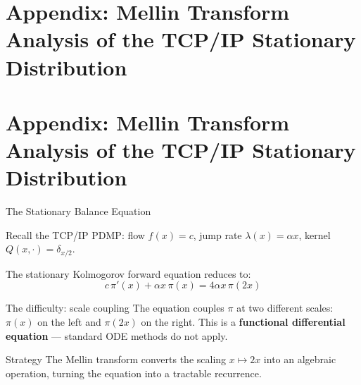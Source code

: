 \documentclass[aspectratio=169]{beamer}
\begin{document}

\section{Appendix: Mellin Transform Analysis of the TCP/IP
          Stationary Distribution}


\appendix
\section*{Appendix: Mellin Transform Analysis of the TCP/IP
          Stationary Distribution}

\begin{frame}{The Stationary Balance Equation}

  Recall the TCP/IP PDMP: flow $f(x) = c$, jump rate
  $\lambda(x) = \alpha x$, kernel $Q(x,\cdot) = \delta_{x/2}$.

  \bigskip
  The stationary Kolmogorov forward equation reduces to:
  \[
    \boxed{c\,\pi'(x) + \alpha x\,\pi(x) = 4\alpha x\,\pi(2x)}
  \]

  \bigskip
  \begin{alertblock}{The difficulty: scale coupling}
    The equation couples $\pi$ at two different scales:
    $\pi(x)$ on the left and $\pi(2x)$ on the right.
    This is a \textbf{functional differential equation}
    --- standard ODE methods do not apply.
  \end{alertblock}

  \bigskip
  \begin{block}{Strategy}
    The Mellin transform converts the scaling
    $x \mapsto 2x$ into an algebraic operation,
    turning the equation into a tractable recurrence.
  \end{block}

\end{frame}
\end{document}

